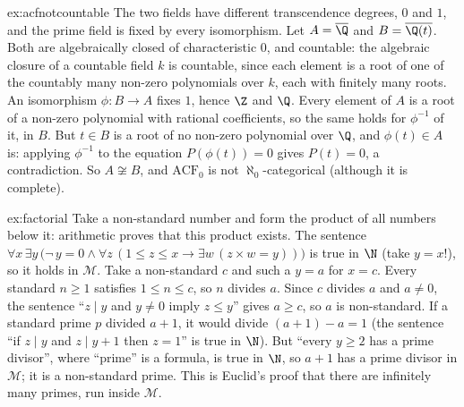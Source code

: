 \begin{solution}{ex:acfnotcountable}
\idea The two fields have different transcendence degrees, $0$ and $1$, and the prime field is fixed by every isomorphism.
\writeup Let $A=\overline{\Q}$ and $B=\overline{\Q(t)}$. Both are algebraically closed of characteristic $0$, and countable: the algebraic closure of a countable field $k$ is countable, since each element is a root of one of the countably many non-zero polynomials over $k$, each with finitely many roots. An isomorphism $\phi:B\to A$ fixes $1$, hence $\Z$ and $\Q$. Every element of $A$ is a root of a non-zero polynomial with rational coefficients, so the same holds for $\phi^{-1}$ of it, in $B$. But $t\in B$ is a root of no non-zero polynomial over $\Q$, and $\phi(t)\in A$ is: applying $\phi^{-1}$ to the equation $P(\phi(t))=0$ gives $P(t)=0$, a contradiction. So $A\not\cong B$, and $\mathrm{ACF}_0$ is not $\aleph_0$-categorical (although it is complete).
\end{solution}

\begin{solution}{ex:factorial}
\idea Take a non-standard number and form the product of all numbers below it: arithmetic proves that this product exists.
\writeup The sentence $\forall x\,\exists y\,\bigl(\neg\,y=0\land\forall z\,(1\le z\le x\to\exists w\,(z\times w=y))\bigr)$ is true in $\N$ (take $y=x!$), so it holds in $\mathcal M$. Take a non-standard $c$ and such a $y=a$ for $x=c$. Every standard $n\ge1$ satisfies $1\le n\le c$, so $n$ divides $a$. Since $c$ divides $a$ and $a\ne0$, the sentence ``$z\mid y$ and $y\ne0$ imply $z\le y$'' gives $a\ge c$, so $a$ is non-standard. If a standard prime $p$ divided $a+1$, it would divide $(a+1)-a=1$ (the sentence ``if $z\mid y$ and $z\mid y+1$ then $z=1$'' is true in $\N$). But ``every $y\ge2$ has a prime divisor'', where ``prime'' is a formula, is true in $\N$, so $a+1$ has a prime divisor in $\mathcal M$; it is a non-standard prime. This is Euclid's proof that there are infinitely many primes, run inside $\mathcal M$.
\end{solution}

